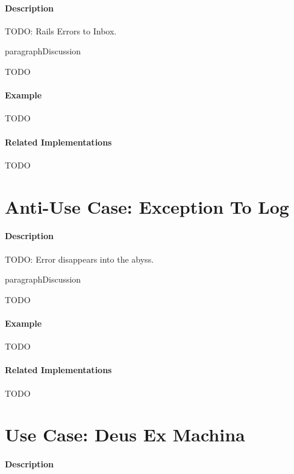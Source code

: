 \paragraph{Description}

{\Large TODO:} Rails Errors to Inbox.

paragraph{Discussion}

{\Large TODO}

\paragraph{Example}

{\Large TODO}

\paragraph{Related Implementations}

{\Large TODO}

\section{Anti-Use Case: Exception To Log}

\paragraph{Description}

{\Large TODO:} Error disappears into the abyss.

paragraph{Discussion}

{\Large TODO}

\paragraph{Example}

{\Large TODO}

\paragraph{Related Implementations}

{\Large TODO}

\section{Use Case: Deus Ex Machina}

\paragraph{Description}

